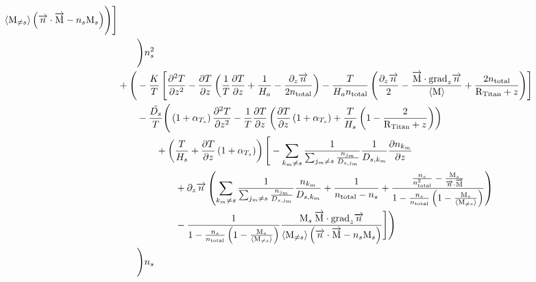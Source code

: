 \begin{landscape}
\begin{equation}
\begin{split}
                                                             {\ensuremath{\langle\text{M}_{\neq s}\rangle}\left(\ensuremath{\overrightarrow{n}\cdot\overrightarrow{\text{M}}} - \ensuremath{n}_s\ensuremath{\text{M}}_s\right)}
                                        \Bigg)
                \Bigg]\\
& \qquad\Bigg)n_s^2\\
& + \Bigg( - \frac{K}{T} 
          \left[ \frac{\partial^2T}{\partial{z}^2} 
           - \frac{\partial T}{\partial z}\left(\frac{1}{T}\frac{\partial T}{\partial z} + \frac{1}{H_a} - \frac{\partial_{z}{\overrightarrow{n}}}{2n_\text{total}}\right)
           - \frac{T}{H_an_\text{total}}
                             \left(
                                  \frac{\partial_{z}{\overrightarrow{n}}}{2}
                                - \frac{\overrightarrow{\text{M}}\cdot\text{grad}_{z}\overrightarrow{n}}{\langle\text{M}\rangle}
                                + \frac{2n_\text{total}}{\text{R}_\text{Titan} + z} 
                            \right)
          \right]  \\
& \qquad - \frac{\tilde{D_s}}{T}
                \Bigg(
                        \left(1 + \alpha_{T_s}\right)\frac{\partial^2T}{\partial{z}^2} 
                      - \frac{1}{T}\frac{\partial T}{\partial z}\left(\frac{\partial T}{\partial z}\left(1 + \alpha_{T_s}\right)
                                         + \frac{T}{H_s}\left(1 - \frac{2}{\text{R}_\text{Titan} + z}\right)
                                   \right)
             \\
&\qquad\qquad + \left(\frac{T}{H_s} + \frac{\partial T}{\partial z}\left(1 + \alpha_{T_s}\right)\right)
\Bigg[ - \sum_{k_m\neq s}\frac{1}{\sum_{j_m \neq s}\frac{n_{j_m}}{D_{s,j_m}}}
                                \frac{1}{D_{s,k_m}} \frac{\partial n_{k_m}}{\partial z} \\
& \qquad\qquad\qquad + \partial_{z}{\overrightarrow{n}}
                 \left(\sum_{k_m\neq s}\frac{1}{\sum_{j_m \neq s}\frac{n_{j_m}}{D_{s,j_m}}}\frac{n_{k_m}}{D_{s,k_m}}
                      + \frac{1}{n_\text{total} - n_s}
                      + \frac{\frac{n_s}{n_\text{total}^2} - \frac{\text{M}_s}{\overrightarrow{n}\cdot\overrightarrow{\text{M}}}}
                             {1-\frac{n_s}{n_\text{total}}\left(1 - \frac{\text{M}_s}{\langle\text{M}_{\neq s}\rangle}\right)}
                 \right) \\
&\qquad\qquad\qquad 
               - \frac{1}{1-\frac{n_s}{n_\text{total}}\left(1 - \frac{\text{M}_s}{\langle\text{M}_{\neq s}\rangle}\right)}
                           \frac{\text{M}_s\:\overrightarrow{\text{M}}\cdot\text{grad}_{z}\overrightarrow{n}}
                                 {\langle\text{M}_{\neq s}\rangle\left(\overrightarrow{n}\cdot\overrightarrow{\text{M}} - n_s\text{M}_s\right)}
\Bigg]
\Bigg)\\
& \qquad\Bigg)n_s
\end{split}
\label{Titan:diff_nw_deriv}
\end{equation}
\end{landscape}
